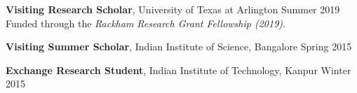 \documentclass[10pt]{article}
\begin{document}
\vspace{0.35em}
\textbf{Visiting Research Scholar}, {{University of Texas at Arlington}} \hfill \normalsize{Summer 2019}\\ 
Funded through the \emph{Rackham Research Grant Fellowship (2019)}.


\vspace{0.35em}
\textbf{Visiting Summer Scholar}, {{Indian Institute of Science, Bangalore}} \hfill Spring 2015 %

\textbf{Exchange Research Student}, {{Indian Institute of Technology, Kanpur}} \hfill Winter 2015 %





\end{document}

